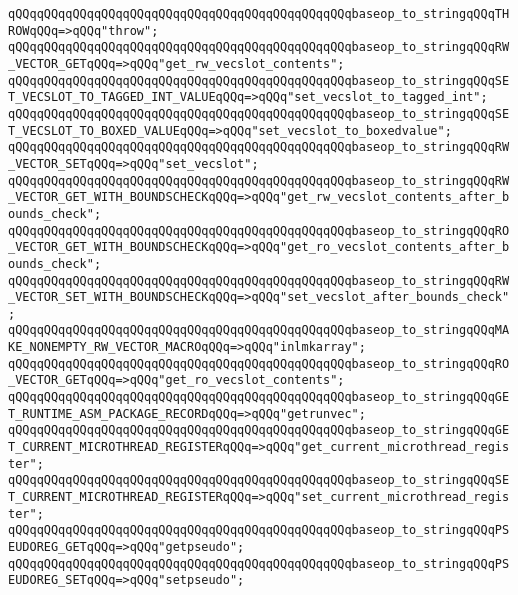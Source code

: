 \verb|qQQqqQQqqQQqqQQqqQQqqQQqqQQqqQQqqQQqqQQqqQQqqQQqbaseop_to_stringqQQqTHROWqQQq=>qQQq"throw";|\newline
\verb|qQQqqQQqqQQqqQQqqQQqqQQqqQQqqQQqqQQqqQQqqQQqqQQqbaseop_to_stringqQQqRW_VECTOR_GETqQQq=>qQQq"get_rw_vecslot_contents";|\newline
\verb|qQQqqQQqqQQqqQQqqQQqqQQqqQQqqQQqqQQqqQQqqQQqqQQqbaseop_to_stringqQQqSET_VECSLOT_TO_TAGGED_INT_VALUEqQQq=>qQQq"set_vecslot_to_tagged_int";|\newline
\verb|qQQqqQQqqQQqqQQqqQQqqQQqqQQqqQQqqQQqqQQqqQQqqQQqbaseop_to_stringqQQqSET_VECSLOT_TO_BOXED_VALUEqQQq=>qQQq"set_vecslot_to_boxedvalue";|\newline
\verb|qQQqqQQqqQQqqQQqqQQqqQQqqQQqqQQqqQQqqQQqqQQqqQQqbaseop_to_stringqQQqRW_VECTOR_SETqQQq=>qQQq"set_vecslot";|\newline
\verb|qQQqqQQqqQQqqQQqqQQqqQQqqQQqqQQqqQQqqQQqqQQqqQQqbaseop_to_stringqQQqRW_VECTOR_GET_WITH_BOUNDSCHECKqQQq=>qQQq"get_rw_vecslot_contents_after_bounds_check";|\newline
\verb|qQQqqQQqqQQqqQQqqQQqqQQqqQQqqQQqqQQqqQQqqQQqqQQqbaseop_to_stringqQQqRO_VECTOR_GET_WITH_BOUNDSCHECKqQQq=>qQQq"get_ro_vecslot_contents_after_bounds_check";|\newline
\verb|qQQqqQQqqQQqqQQqqQQqqQQqqQQqqQQqqQQqqQQqqQQqqQQqbaseop_to_stringqQQqRW_VECTOR_SET_WITH_BOUNDSCHECKqQQq=>qQQq"set_vecslot_after_bounds_check";|\newline
\verb|qQQqqQQqqQQqqQQqqQQqqQQqqQQqqQQqqQQqqQQqqQQqqQQqbaseop_to_stringqQQqMAKE_NONEMPTY_RW_VECTOR_MACROqQQq=>qQQq"inlmkarray";|\newline
\verb|qQQqqQQqqQQqqQQqqQQqqQQqqQQqqQQqqQQqqQQqqQQqqQQqbaseop_to_stringqQQqRO_VECTOR_GETqQQq=>qQQq"get_ro_vecslot_contents";|\newline
\verb|qQQqqQQqqQQqqQQqqQQqqQQqqQQqqQQqqQQqqQQqqQQqqQQqbaseop_to_stringqQQqGET_RUNTIME_ASM_PACKAGE_RECORDqQQq=>qQQq"getrunvec";|\newline
\verb|qQQqqQQqqQQqqQQqqQQqqQQqqQQqqQQqqQQqqQQqqQQqqQQqbaseop_to_stringqQQqGET_CURRENT_MICROTHREAD_REGISTERqQQq=>qQQq"get_current_microthread_register";|\newline
\verb|qQQqqQQqqQQqqQQqqQQqqQQqqQQqqQQqqQQqqQQqqQQqqQQqbaseop_to_stringqQQqSET_CURRENT_MICROTHREAD_REGISTERqQQq=>qQQq"set_current_microthread_register";|\newline
\verb|qQQqqQQqqQQqqQQqqQQqqQQqqQQqqQQqqQQqqQQqqQQqqQQqbaseop_to_stringqQQqPSEUDOREG_GETqQQq=>qQQq"getpseudo";|\newline
\verb|qQQqqQQqqQQqqQQqqQQqqQQqqQQqqQQqqQQqqQQqqQQqqQQqbaseop_to_stringqQQqPSEUDOREG_SETqQQq=>qQQq"setpseudo";|\newline
